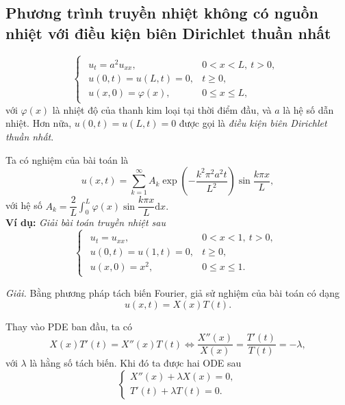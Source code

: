 \documentclass[10pt, a4paper]{article}
\begin{document}
	\subsection{Phương trình truyền nhiệt không có nguồn nhiệt với điều kiện biên Dirichlet thuần nhất}
	\vspace{2mm}
	\begin{tcolorbox}[enhanced,colback=blue!5!white,colframe=blue!75!black,sharp corners=all,shadow={0mm}{0mm}{-1.5mm}%
		{fill=blue!75!red,opacity=0.3},title=\textbf{Dạng của bài toán}]
		$$\begin{cases}
			\begin{array}{ll}
				u_t=a^2u_{xx}, & 0<x<L,~t>0,\\
				u(0,t)=u(L,t)=0, & t\ge0,\\
				u(x,0)=\varphi(x), & 0\le x\le L,
			\end{array}
		\end{cases}$$
		với $\varphi(x)$ là nhiệt độ của thanh kim loại tại thời điểm đầu, và $a$ là hệ số dẫn nhiệt.\vskip7pt
		Hơn nữa, $u(0,t)=u(L,t)=0$ được gọi là \textit{điều kiện biên Dirichlet thuần nhất}.
	\end{tcolorbox}
	\vspace{2mm}
	Ta có nghiệm của bài toán là $$u(x,t)=\displaystyle\sum_{k=1}^\infty A_k\exp\left(-\frac{k^2\pi^2a^2t}{L^2}\right)\sin\dfrac{k\pi x}{L},$$
	với hệ số $A_k=\dfrac2L\displaystyle\int_0^L\varphi(x)\sin\dfrac{k\pi x}{L}\text{d}x.$\\
	
	\textbf{Ví dụ:} \textit{Giải bài toán truyền nhiệt sau} $$\begin{cases}
		\begin{array}{ll}
			u_t=u_{xx}, & 0<x<1,~t>0,\\
			u(0,t)=u(1,t)=0, & t\ge0,\\
			u(x,0)=x^2, & 0\le x\le 1.
		\end{array}
	\end{cases}$$
	
	\textit{Giải.} Bằng phương pháp tách biến Fourier, giả sử nghiệm của bài toán có dạng $$u(x,t)=X(x)T(t).$$
	
	Thay vào PDE ban đầu, ta có $$X(x)T'(t)=X''(x)T(t)\iff\frac{X''(x)}{X(x)}=\frac{T'(t)}{T(t)}=-\lambda,$$
	với $\lambda$ là hằng số tách biến. Khi đó ta được hai ODE sau $$\begin{cases}
		X''(x)+\lambda X(x)=0,\\
		T'(t)+\lambda T(t)=0.
	\end{cases}$$
	
\end{document}
